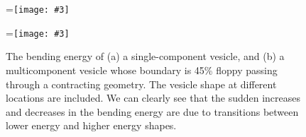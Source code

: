 \documentclass[twoside,twocolumn,9pt]{article}
\newcommand{\subfigimg}[3][,]{%
  \setbox1=\hbox{\texttt{[image: \#3]}}%
  \leavevmode\rlap{\usebox1}%
  \rlap{\hspace*{0pt}\raisebox{\dimexpr\ht1-0\baselineskip}{\bf
  \normalsize #2}}%
  \phantom{\usebox1}%
}
\begin{document}
\begin{figure}
    \centering
    \subfigimg[width=\columnwidth]{(a)}{figures/bendingSC.pdf}
    \subfigimg[width=\columnwidth]{(b)}{figures/bendingEngMC45.pdf}
    \caption{\label{fig:bendingSC_contracting} The bending energy of (a) a single-component vesicle, and (b) a multicomponent vesicle whose boundary is 45\% floppy passing through a contracting geometry. The vesicle shape at different locations are included. We can clearly see that the sudden increases and decreases in the bending energy are due to transitions between lower energy and higher energy shapes.}
\end{figure}



\end{document}
